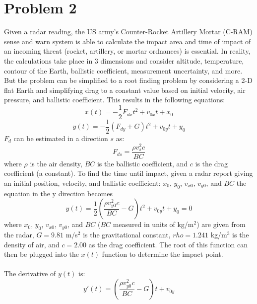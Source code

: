 \documentclass{article} %
\begin{document}
\section{Problem 2}
Given a radar reading, the US army's Counter-Rocket Artillery Mortar (C-RAM) sense and warn system is able to calculate the impact area and time of impact of an incoming threat (rocket, artillery, or mortar ordnances) is essential.  In reality, the calculations take place in 3 dimensions and consider altitude, temperature, contour of the Earth, ballistic coefficient, measurement uncertainty, and more. But the problem can be simplified to a root finding problem by considering a 2-D flat Earth and simplifying drag to a constant value based on initial velocity, air pressure, and ballistic coefficient. This results in the following equations:
\begin{equation}
x(t)= -\frac{1}{2} F_{dx} t^2 + v_{0x}t + x_0
\end{equation}
\begin{equation}
y(t)= -\frac{1}{2} (F_{dy} + G) t^2 + v_{0y}t + y_0
\end{equation}
$F_d$ can be estimated in a direction $s$ as:
\begin{equation}
F_{ds}= \frac{\rho v_s^2 c}{BC}
\end{equation}
where $\rho$ is the air density, $BC$ is the ballistic coefficient, and $c$ is the drag coefficient (a constant).  To find the time until impact, given a radar report giving an initial position, velocity, and ballistic coefficient: $x_0$, $y_0$, $v_{x0}$, $v_{y0}$, and $BC$ the equation in the y direction becomes
\begin{equation}
y(t)= \frac{1}{2} (\frac{\rho v_{y0}^2 c}{BC} - G) t^2 + v_{0y}t + y_0 = 0
\end{equation}
where $x_0$, $y_0$, $v_{x0}$, $v_{y0}$, and $BC$ ($BC$ measured in units of kg/m$^2$) are given from the radar, $G = 9.81$ m/s$^2$ is the gravitational constant, $rho=1.241$ kg/m$^3$ is the density of air, and $c=2.00$ as the drag coefficient.  The root of this function can then be plugged into the $x(t)$ function to determine the impact point.
\\
\\
The derivative of $y(t)$ is:
\begin{equation}
y'(t)=(\frac{\rho v_{y0}^2 c}{BC} - G) t + v_{0y}
\end{equation}
\end{document}
